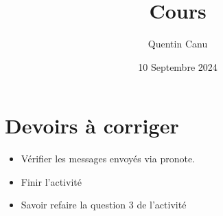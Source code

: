 \documentclass{article}
\title{Cours}
\date{10 Septembre 2024}
\author{Quentin Canu}
\begin{document}
\maketitle

\section{Devoirs à corriger}
\begin{itemize}
\item Vérifier les messages envoyés via pronote.
\item Finir l'activité
\item Savoir refaire la question $3$ de l'activité
\end{itemize}
\end{document}
